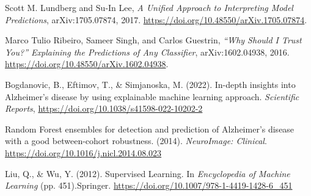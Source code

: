 \documentclass[a4paper,12pt]{report}
\begin{document}
    \begin{thebibliography}{9}
        Scott M. Lundberg and Su-In Lee, \textit{A Unified Approach to Interpreting Model Predictions}, arXiv:1705.07874, 2017. \url{https://doi.org/10.48550/arXiv.1705.07874}.
        
        Marco Tulio Ribeiro, Sameer Singh, and Carlos Guestrin, \textit{“Why Should I Trust You?” Explaining the Predictions of Any Classifier}, arXiv:1602.04938, 2016. \url{https://doi.org/10.48550/arXiv.1602.04938}.


Bogdanovic, B., Eftimov, T., \& Simjanoska, M. (2022). In-depth insights into Alzheimer’s disease by using explainable machine learning approach. \textit{Scientific Reports}, \url {https://doi.org/10.1038/s41598-022-10202-2}


Random Forest ensembles for detection and prediction of Alzheimer's disease with a good between-cohort robustness. (2014). \textit{NeuroImage: Clinical}. \url{https://doi.org/10.1016/j.nicl.2014.08.023}


Liu, Q., \& Wu, Y. (2012). Supervised Learning. In \textit{Encyclopedia of Machine Learning} (pp. 451).Springer.  \url{https://doi.org/10.1007/978-1-4419-1428-6\_451}



    \end{thebibliography}
\end{document}
